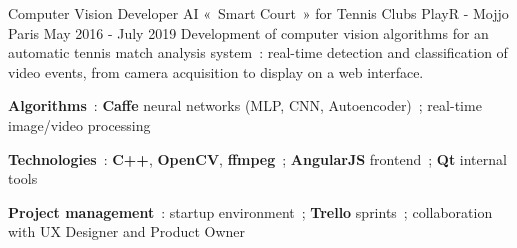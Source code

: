 \begin{cventries}
	\cventry
	{Computer Vision Developer}
	{AI «~Smart Court~» for Tennis Clubs}
	{PlayR - Mojjo} %
	{Paris} %
	{May 2016 - July 2019} %
	{Development of computer vision algorithms for an automatic tennis match analysis system~: real-time detection and classification of video events, from camera acquisition to display on a web interface.} %
	{
		\begin{cvitems}
			\item{\textbf{Algorithms}~: \textbf{Caffe} neural networks (MLP, CNN, Autoencoder)~; real-time image\slash video processing}
			\item{\textbf{Technologies}~: \textbf{C++}, \textbf{OpenCV}, \textbf{ffmpeg}~; \textbf{AngularJS} frontend~; \textbf{Qt} internal tools}
			\item{\textbf{Project management}~: startup environment~; \textbf{Trello} sprints~; collaboration with UX Designer and Product Owner}
		\end{cvitems}
	}

\end{cventries}
